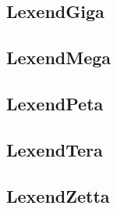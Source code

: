 \documentclass[oneside,a4paper]{ltxdoc}
\begin{document}
\subsection{LexendGiga}

\LexendGiga{
	\small{\blindtext}\bigskip

	\normalsize{\blindtext}\bigskip

	\large{\blindtext}
}

\subsection{LexendMega}

\LexendMega{
	\small{\blindtext}\bigskip

	\normalsize{\blindtext}\bigskip

	\large{\blindtext}
}

\subsection{LexendPeta}

\LexendPeta{
	\small{\blindtext}\bigskip

	\normalsize{\blindtext}\bigskip

	\large{\blindtext}
}

\subsection{LexendTera}

\LexendTera{
	\small{\blindtext}\bigskip

	\normalsize{\blindtext}\bigskip

	\large{\blindtext}
}

\subsection{LexendZetta}

\LexendZetta{
	\small{\blindtext}\bigskip

	\normalsize{\blindtext}\bigskip

	\large{\blindtext}
}
\end{document}
